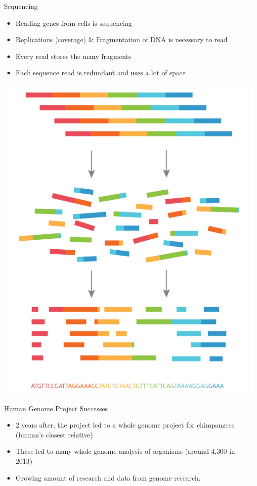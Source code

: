 \documentclass{beamer}
\begin{document}
\begin{frame}{Sequencing}
  \begin{itemize}   
    \item Reading genes from cells is sequencing
    \item Replications (coverage) \& Fragmentation of DNA is necessary to read
    \item Every read stores the many fragments
    \item Each sequence read is redundant and uses a lot of space
  \end{itemize}
  \centering
  \includegraphics[scale=0.2]{sequencing.png}
\end{frame}

\begin{frame}{Human Genome Project Successes}
  \begin{itemize}   
    \item 2 years after, the project led to a whole genome project for chimpanzees (human's closest relative) \cite{campbell}
    \item These led to many whole genome analysis of organisms (around 4,300 in 2013) \cite{campbell}
    \item Growing amount of research and data from genome research.
  \end{itemize}
\end{frame}
\end{document}

